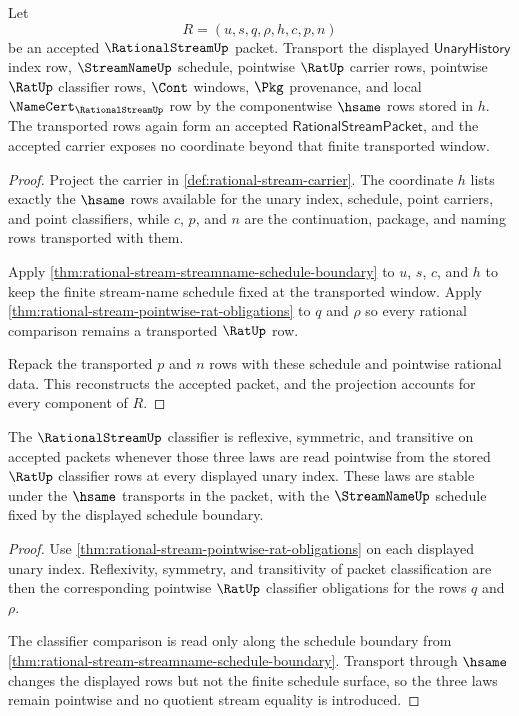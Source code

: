 \begin{theorem}
\label{thm:rational-stream-finite-window-carrier-transport}
Let
$$
R=(u,s,q,\rho,h,c,p,n)
$$
be an accepted $\RationalStreamUp$ packet. Transport the displayed
$\mathsf{UnaryHistory}$ index row, $\StreamNameUp$ schedule, pointwise
$\RatUp$ carrier rows, pointwise $\RatUp$ classifier rows, $\Cont$ windows,
$\Pkg$ provenance, and local $\NameCert_{\RationalStreamUp}$ row by the
componentwise $\hsame$ rows stored in $h$. The transported rows again form an
accepted $\mathsf{RationalStreamPacket}$, and the accepted carrier exposes no
coordinate beyond that finite transported window.
\end{theorem}
\begin{proof}
Project the carrier in \autoref{def:rational-stream-carrier}. The coordinate
$h$ lists exactly the $\hsame$ rows available for the unary index, schedule,
point carriers, and point classifiers, while $c$, $p$, and $n$ are the
continuation, package, and naming rows transported with them.

Apply \autoref{thm:rational-stream-streamname-schedule-boundary} to $u$, $s$,
$c$, and $h$ to keep the finite stream-name schedule fixed at the transported
window. Apply \autoref{thm:rational-stream-pointwise-rat-obligations} to $q$
and $\rho$ so every rational comparison remains a transported $\RatUp$ row.

Repack the transported $p$ and $n$ rows with these schedule and pointwise
rational data. This reconstructs the accepted packet, and the projection
accounts for every component of $R$.
\end{proof}

\begin{theorem}
\label{thm:rational-stream-pointwise-classifier-laws}
The $\RationalStreamUp$ classifier is reflexive, symmetric, and transitive on
accepted packets whenever those three laws are read pointwise from the stored
$\RatUp$ classifier rows at every displayed unary index. These laws are stable
under the $\hsame$ transports in the packet, with the $\StreamNameUp$ schedule
fixed by the displayed schedule boundary.
\end{theorem}
\begin{proof}
Use \autoref{thm:rational-stream-pointwise-rat-obligations} on each displayed
unary index. Reflexivity, symmetry, and transitivity of packet classification
are then the corresponding pointwise $\RatUp$ classifier obligations for the
rows $q$ and $\rho$.

The classifier comparison is read only along the schedule boundary from
\autoref{thm:rational-stream-streamname-schedule-boundary}. Transport through
$\hsame$ changes the displayed rows but not the finite schedule surface, so the
three laws remain pointwise and no quotient stream equality is introduced.
\end{proof}

